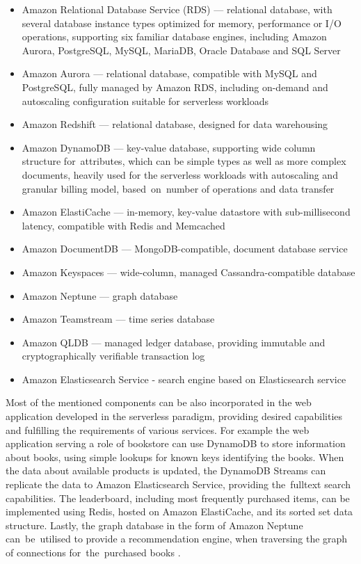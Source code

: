 \begin{itemize}
   \item Amazon Relational Database Service (RDS) --- relational database, with several database instance types optimized for memory, performance or I/O operations, supporting six familiar database engines, including Amazon Aurora, PostgreSQL, MySQL, MariaDB, Oracle Database and SQL Server
   \item Amazon Aurora --- relational database, compatible with MySQL and PostgreSQL, fully managed by Amazon RDS, including on-demand and autoscaling configuration suitable for serverless workloads
   \item Amazon Redshift --- relational database, designed for data warehousing
   \item Amazon DynamoDB --- key-value database, supporting wide column structure for~attributes, which can be simple types as well as more complex documents, heavily used for the serverless workloads with autoscaling and granular billing model, based~on~number of operations and data transfer
   \item Amazon ElastiCache --- in-memory, key-value datastore with sub-millisecond latency, compatible with Redis and Memcached
   \item Amazon DocumentDB --- MongoDB-compatible, document database service
   \item Amazon Keyspaces --- wide-column, managed Cassandra-compatible database
   \item Amazon Neptune --- graph database
   \item Amazon Teamstream --- time series database
   \item Amazon QLDB --- managed ledger database, providing immutable and cryptographically verifiable transaction log
   \item Amazon Elasticsearch Service - search engine based on Elasticsearch service
\end{itemize}

Most of the mentioned components can be also incorporated in the web application developed in the serverless paradigm, providing desired capabilities and fulfilling the requirements of various services.
For example the web application serving a role of bookstore can use DynamoDB to store information about books, using simple lookups for known keys identifying the books.
When the data about available products is updated, the DynamoDB Streams can replicate the data to Amazon Elasticsearch Service, providing the~fulltext search capabilities.
The leaderboard, including most frequently purchased items, can be implemented using Redis, hosted on Amazon ElastiCache, and its sorted set data structure.
Lastly, the graph database in the form of Amazon Neptune can~be~utilised to provide a recommendation engine, when traversing the graph of connections for~the~purchased books \cite{DatabasesOnAWSTheRightToolForTheRightJob}.

